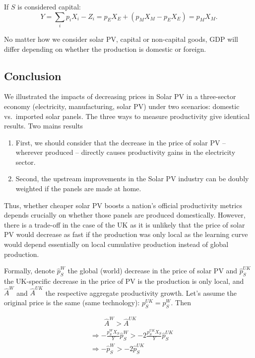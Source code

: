 \documentclass[11pt]{article}
\begin{document}
If $S$ is considered capital: 
\begin{equation}
     Y =  \sum_i p_i X_i - Z_i = p_E X_E + (p_M X_M - p_E X_E) = p_M X_M.
\end{equation}

No matter how we consider solar PV, capital or non-capital goods, GDP will differ depending on whether the production is domestic or foreign.

\subsection{Conclusion}
We illustrated the impacts of decreasing prices in Solar PV in a three-sector economy (electricity, manufacturing, solar PV) under two scenarios: domestic vs.\ imported solar panels. The three ways to measure productivity give identical results. 
Two mains results
\begin{enumerate}
    \item First, we should consider that the decrease in the price of solar PV -- wherever produced -- directly causes productivity gains in the electricity sector.
    \item Second, the upstream improvements in the Solar PV industry can be doubly weighted if the panels are made at home.
\end{enumerate}

Thus, whether cheaper solar PV boosts a nation's official productivity metrics depends crucially on whether those panels are produced domestically. However, there is a trade-off in the case of the UK as it is unlikely that the price of solar PV would decrease as fast if the production was only local as the learning curve would depend essentially on local cumulative production instead of global production. 

Formally, denote $\hat{p}_S^W$ the global (world) decrease in the price of solar PV and $\hat{p}_S^{UK}$ the UK-specific decrease in the price of PV is the production is only local, and $\hat{A}^{W}$ and $\hat{A}^{UK}$ the respective aggregate productivity growth. Let's assume the original price is the same (same technology): $p_S^{UK}=p_S^{W}$. Then

\begin{align*}
&\quad \quad \hat{A}^{W} > \hat{A}^{UK}\\
 &\Rightarrow   -\frac{p_S^WX_S}{Y} \hat{p}_{S}^W>-2\frac{p_S^{UK}X_S}{Y} \hat{p}_{S}^{UK}   \\
  &\Rightarrow   -\hat{p}_{S}^W>-2 \hat{p}_{S}^{UK}   
\end{align*}
\end{document}
